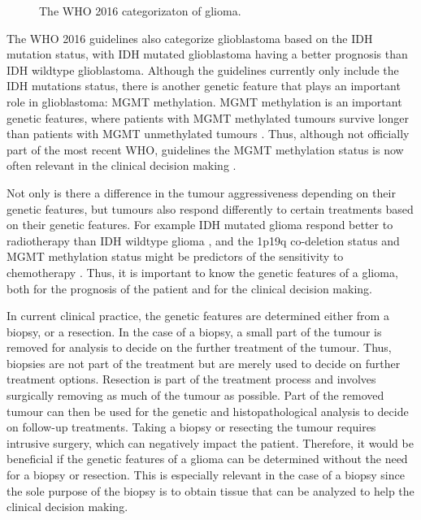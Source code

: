 \begin{figure}[hbt]
    \centering
    \caption{The WHO 2016 categorizaton of glioma.}\label{fig:intro_glioma_categorization}
\end{figure}

The \gls{WHO} 2016 guidelines also categorize glioblastoma based on the \gls{IDH} mutation status, with \gls{IDH} mutated glioblastoma having a better prognosis than \gls{IDH} wildtype glioblastoma.
Although the guidelines currently only include the \gls{IDH} mutations status, there is another genetic feature that plays an important role in glioblastoma: \gls{MGMT} methylation.
\gls{MGMT} methylation is an important genetic features, where patients with \gls{MGMT} methylated tumours survive longer than patients with \gls{MGMT} unmethylated tumours \autocite{martinez2007MGMT, gessler2018MGMT, weller2009molecularGBM}.
Thus, although not officially part of the most recent \gls{WHO}, guidelines the \gls{MGMT} methylation status is now often relevant in the clinical decision making \cite{molinaro2019geneticepidemiology}.

Not only is there a difference in the tumour aggressiveness depending on their genetic features, but tumours also respond differently to certain treatments based on their genetic features.
For example \gls{IDH} mutated glioma respond better to radiotherapy than \gls{IDH} wildtype glioma \autocite{juratli2015IDHtreatment}, and the 1p19q co-deletion status and MGMT methylation status might be predictors of the sensitivity to chemotherapy \autocite{idbaih2007markersresponse}.
Thus, it is important to know the genetic features of a glioma, both for the prognosis of the patient and for the clinical decision making.

In current clinical practice, the genetic features are determined either from a biopsy, or a resection.
In the case of a biopsy, a small part of the tumour is removed for analysis to decide on the further treatment of the tumour.
Thus, biopsies are not part of the treatment but are merely used to decide on further treatment options.
Resection is part of the treatment process and involves surgically removing as much of the tumour as possible.
Part of the removed tumour can then be used for the genetic and histopathological analysis to decide on follow-up treatments.
Taking a biopsy or resecting the tumour requires intrusive surgery, which can negatively impact the patient.
Therefore, it would be beneficial if the genetic features of a glioma can be determined without the need for a biopsy or resection.
This is especially relevant in the case of a biopsy since the sole purpose of the biopsy is to obtain tissue that can be analyzed to help the clinical decision making.

